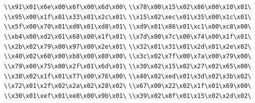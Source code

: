 \verb|\\x91\x01\x6e\x00\x6f\x00\x6d\x00\|\newline
\verb|\\x78\x00\x15\x02\x86\x00\x10\x01\|\newline
\verb|\\x95\x00\x1f\x01\x33\x01\x2c\x01\|\newline
\verb|\\x15\x02\xec\x01\x35\x00\x1c\x01\|\newline
\verb|\\x5f\x00\x70\x01\xd0\x01\xd8\x01\|\newline
\verb|\\xd9\x01\x86\x01\xc1\x00\xc8\x00\|\newline
\verb|\\xb4\x00\xd2\x01\x68\x00\x1f\x01\|\newline
\verb|\\x7d\x00\x7c\x00\x74\x00\x1f\x01\|\newline
\verb|\\x2b\x02\x79\x00\x97\x00\x2e\x01\|\newline
\verb|\\x32\x01\x31\x01\x2d\x01\x2e\x02\|\newline
\verb|\\x40\x02\x60\x00\xb8\x00\x80\x00\|\newline
\verb|\\x3c\x02\x7f\x00\x7a\x00\x79\x00\|\newline
\verb|\\x79\x00\x75\x00\x2f\x01\x6d\x01\|\newline
\verb|\\x30\x02\x15\x02\x27\x02\x65\x00\|\newline
\verb|\\x38\x02\x1f\x01\x77\x00\x76\x00\|\newline
\verb|\\x40\x02\xed\x01\x3d\x02\x3b\x02\|\newline
\verb|\\x72\x01\x2f\x02\x2a\x02\x28\x02\|\newline
\verb|\\x67\x00\x22\x02\x1f\x01\x69\x00\|\newline
\verb|\\x30\x01\xef\x01\xe8\x00\x9b\x01\|\newline
\verb|\\x39\x02\x8f\x01\x15\x02\x2d\x02\|\newline

